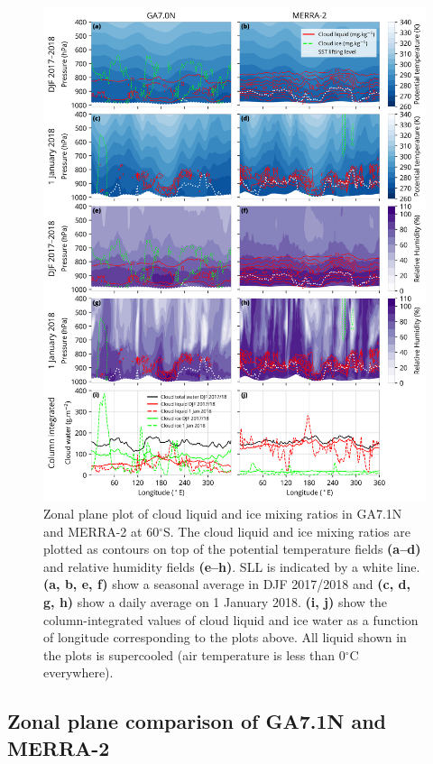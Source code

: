 \begin{figure}[p]
\centering
\centerline{\includegraphics[width=\textwidth]{chapter2/fig/zone_panel_rev2.png}}
\caption[Zonal plane plot of cloud liquid and ice mixing ratios in GA7.1N and MERRA-2 at
60$^\circ$S]{
Zonal plane plot of cloud liquid and ice mixing ratios in GA7.1N and MERRA-2 at
60$^\circ$S. The cloud liquid and ice mixing ratios are plotted as contours on
top of the potential temperature fields \textbf{(a--d)} and relative humidity
fields \textbf{(e--h)}. SLL is indicated by a white line. \textbf{(a, b, e, f)}
show a seasonal average in DJF 2017/2018 and \textbf{(c, d, g, h)}
show a daily average on 1 January 2018. \textbf{(i, j)} show the
column-integrated values of cloud liquid and ice water as a function of
longitude corresponding to the plots above. All liquid shown in the plots
is supercooled (air temperature is less than 0$^\circ$C everywhere).
}
\label{fig:2:zone-panel}
\end{figure}

\subsection{Zonal plane comparison of GA7.1N and MERRA-2}
\label{sec:2:zonal-plane-comparison}

